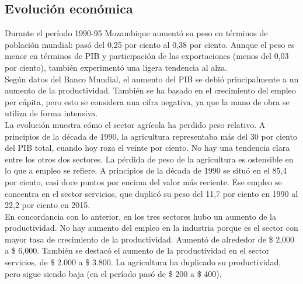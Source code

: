     \subsection{Evolución económica}
    Durante el período 1990-95 Mozambique aumentó su peso en términos de población mundial: pasó del 0,25 por ciento al 0,38 por ciento. Aunque el peso es menor en términos de PIB y participación de las exportaciones (menos del 0,03 por ciento), también experimentó una ligera tendencia al alza.\\
    Según datos del Banco Mundial, el aumento del PIB se debió principalmente a un aumento de la productividad. También se ha basado en el crecimiento del empleo per cápita, pero esto se considera una cifra negativa, ya que la mano de obra se utiliza de forma intensiva.\\
    La evolución muestra cómo el sector agrícola ha perdido peso relativo. A principios de la década de 1990, la agricultura representaba más del 30 por ciento del PIB total, cuando hoy roza el veinte por ciento. No hay una tendencia clara entre los otros dos sectores. La pérdida de peso de la agricultura es ostensible en lo que a empleo se refiere. A principios de la década de 1990 se situó en el 85,4 por ciento, casi doce puntos por encima del valor más reciente. Ese empleo se concentra en el sector servicios, que duplicó su peso del 11,7 por ciento en 1990 al 22,2 por ciento en 2015.\\
    En concordancia con lo anterior, en los tres sectores hubo un aumento de la productividad. No hay aumento del empleo en la industria porque es el sector con mayor tasa de crecimiento de la productividad. Aumentó de alrededor de \$ 2,000 a \$ 6,000. También se destacó el aumento de la productividad en el sector servicios, de \$ 2.000 a \$ 3.800. La agricultura ha duplicado su productividad, pero sigue siendo baja (en el período pasó de \$ 200 a \$ 400).

